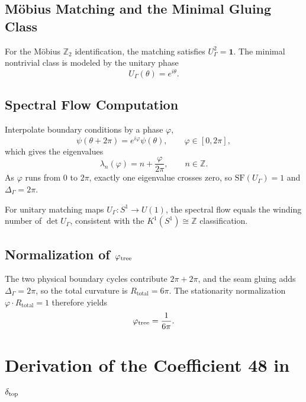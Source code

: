 \subsection{M\"obius Matching and the Minimal Gluing Class}
For the M\"obius $\mathbb{Z}_2$ identification, the matching satisfies $U_\Gamma^2=\mathbf{1}$.
The minimal nontrivial class is modeled by the unitary phase
\begin{equation}
    U_\Gamma(\theta)=e^{i\theta}.
\end{equation}

\subsection{Spectral Flow Computation}
Interpolate boundary conditions by a phase $\varphi$,
\begin{equation}
    \psi(\theta+2\pi)=e^{i\varphi}\psi(\theta), \qquad \varphi\in[0,2\pi],
\end{equation}
which gives the eigenvalues
\begin{equation}
    \lambda_n(\varphi)=n+\frac{\varphi}{2\pi}, \qquad n\in\mathbb{Z}.
\end{equation}
As $\varphi$ runs from $0$ to $2\pi$, exactly one eigenvalue crosses zero, so
$\mathrm{SF}(U_\Gamma)=1$ and $\Delta_\Gamma=2\pi$.

\begin{remark}
For unitary matching maps $U_\Gamma:S^1\to U(1)$, the spectral flow equals the winding
number of $\det U_\Gamma$, consistent with the $K^1(S^1)\cong\mathbb{Z}$ classification.
\end{remark}

\subsection{Normalization of $\varphi_{\mathrm{tree}}$}
The two physical boundary cycles contribute $2\pi+2\pi$, and the seam gluing adds
$\Delta_\Gamma=2\pi$, so the total curvature is $R_{\text{total}}=6\pi$. The stationarity
normalization $\varphi\cdot R_{\text{total}}=1$ therefore yields
\begin{equation}
    \varphi_{\mathrm{tree}} = \frac{1}{6\pi}.
\end{equation}

\section{Derivation of the Coefficient 48 in $\delta_{\mathrm{top}}$}
\label{app:48deriv}

